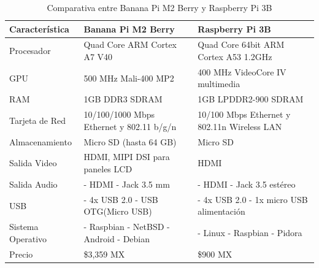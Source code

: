 \pagebreak
\begin{longtable}{|M{3.0cm}|M{4.5cm}|M{4.5cm}|}
    \caption{Comparativa entre Banana Pi M2 Berry y Raspberry Pi 3B}
	\hline
	\textbf{Característica} & \textbf{Banana Pi M2 Berry} & \textbf{Raspberry Pi 3B} \\ 
	\hline
 	Procesador & Quad Core ARM Cortex A7 V40 & Quad Core 64bit ARM Cortex A53 1.2GHz \\
 	\hline
    GPU & 500 MHz Mali-400 MP2 & 400 MHz VideoCore IV multimedia\\
    \hline
    RAM & 1GB DDR3 SDRAM & 1GB LPDDR2-900 SDRAM \\
	\hline
	Tarjeta de Red & 10/100/1000 Mbps Ethernet y 802.11 b/g/n & 10/100 Mbps Ethernet y 802.11n Wireless LAN\\
	\hline
	Almacenamiento & Micro SD (hasta 64 GB) & Micro SD\\
	\hline
	Salida Video & HDMI, MIPI DSI para paneles LCD & HDMI\\
    \hline
    Salida Audio 
    & 
    \newline - HDMI 
    \newline - Jack 3.5 mm 
    & 
    \newline - HDMI
    \newline - Jack 3.5 estéreo \\
    \hline
    USB & 
    \newline - 4x USB 2.0 
    \newline - USB OTG(Micro USB) 
    & 
    \newline - 4x USB 2.0
    \newline - 1x micro USB alimentación \\
    \hline
    Sistema Operativo 
    & 
    \newline - Raspbian
    \newline - NetBSD
    \newline - Android
    \newline - Debian 
    &
    \newline - Linux
    \newline - Raspbian
    \newline - Pidora \\
    \hline
    Precio & \$3,359 MX & \$900 MX \\
	\hline
	
\end{longtable}



